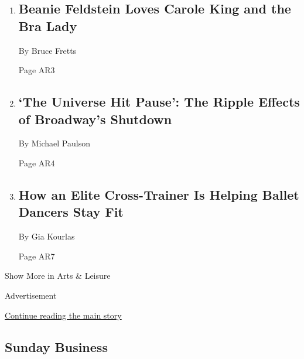 \begin{enumerate}
\def\labelenumi{\arabic{enumi}.}
\item
  \href{/2020/05/05/movies/beanie-feldstein-favorites.html}{}

  \hypertarget{beanie-feldstein-loves-carole-king-and-the-bra-lady}{%
  \subsection{Beanie Feldstein Loves Carole King and the Bra
  Lady}\label{beanie-feldstein-loves-carole-king-and-the-bra-lady}}

  By Bruce Fretts

  Page AR3
\item
  \href{/2020/05/07/theater/mrs-doubtfire-broadway-shutdown-virus.html}{}

  \hypertarget{the-universe-hit-pause-the-ripple-effects-of-broadways-shutdown-1}{%
  \subsection{`The Universe Hit Pause': The Ripple Effects of Broadway's
  Shutdown}\label{the-universe-hit-pause-the-ripple-effects-of-broadways-shutdown-1}}

  By Michael Paulson

  Page AR4
\item
  \href{/2020/05/05/arts/dance/joel-prouty-cross-trainer-ballet.html}{}

  \hypertarget{how-an-elite-cross-trainer-is-helping-ballet-dancers-stay-fit}{%
  \subsection{How an Elite Cross-Trainer Is Helping Ballet Dancers Stay
  Fit}\label{how-an-elite-cross-trainer-is-helping-ballet-dancers-stay-fit}}

  By Gia Kourlas

  Page AR7
\end{enumerate}

Show More in Arts \& Leisure

Advertisement

\protect\hyperlink{after-mid4}{Continue reading the main story}

\hypertarget{sunday-business}{%
\subsection{Sunday Business}\label{sunday-business}}

